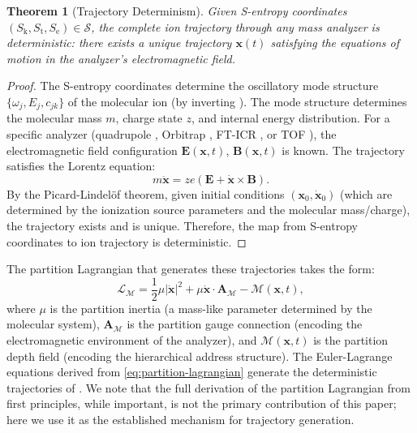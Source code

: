 \documentclass[11pt,twocolumn,a4paper]{article}
\newtheorem{theorem}{Theorem}[section]
\theoremstyle{definition}
\theoremstyle{remark}
\newcommand{\Sk}{S_{\mathrm{k}}}
\newcommand{\St}{S_{\mathrm{t}}}
\newcommand{\Se}{S_{\mathrm{e}}}
\newcommand{\Sspace}{\mathcal{S}}
\newcommand{\Depth}{\mathcal{M}}
\newcommand{\partinert}{\mu}
\newcommand{\Apartition}{\mathbf{A}_{\mathcal{M}}}
\newcommand{\Lagr}{\mathcal{L}}
\begin{document}
\begin{theorem}[Trajectory Determinism]\label{thm:trajectory-determ}
Given S-entropy coordinates $(\Sk, \St, \Se) \in \Sspace$, the complete ion trajectory through any mass analyzer is deterministic: there exists a unique trajectory $\mathbf{x}(t)$ satisfying the equations of motion in the analyzer's electromagnetic field.
\end{theorem}

\begin{proof}
The S-entropy coordinates determine the oscillatory mode structure $\{\omega_j, E_j, c_{jk}\}$ of the molecular ion (by inverting ). The mode structure determines the molecular mass $m$, charge state $z$, and internal energy distribution. For a specific analyzer (quadrupole \citep{paul1990}, Orbitrap \citep{makarov2000}, FT-ICR \citep{marshall1998}, or TOF \citep{wiley1955}), the electromagnetic field configuration $\mathbf{E}(\mathbf{x}, t)$, $\mathbf{B}(\mathbf{x}, t)$ is known. The trajectory satisfies the Lorentz equation:
\begin{equation}
  m \ddot{\mathbf{x}} = z e (\mathbf{E} + \dot{\mathbf{x}} \times \mathbf{B}).
\end{equation}
By the Picard-Lindel\"{o}f theorem, given initial conditions $(\mathbf{x}_0, \dot{\mathbf{x}}_0)$ (which are determined by the ionization source parameters and the molecular mass/charge), the trajectory exists and is unique. Therefore, the map from S-entropy coordinates to ion trajectory is deterministic.
\end{proof}

The partition Lagrangian that generates these trajectories takes the form:
\begin{equation}\label{eq:partition-lagrangian}
  \Lagr_{\Depth} = \frac{1}{2} \partinert |\dot{\mathbf{x}}|^2 + \partinert \dot{\mathbf{x}} \cdot \Apartition - \Depth(\mathbf{x}, t),
\end{equation}
where $\partinert$ is the partition inertia (a mass-like parameter determined by the molecular system), $\Apartition$ is the partition gauge connection (encoding the electromagnetic environment of the analyzer), and $\Depth(\mathbf{x}, t)$ is the partition depth field (encoding the hierarchical address structure). The Euler-Lagrange equations derived from \eqref{eq:partition-lagrangian} generate the deterministic trajectories of . We note that the full derivation of the partition Lagrangian from first principles, while important, is not the primary contribution of this paper; here we use it as the established mechanism for trajectory generation.
\end{document}
